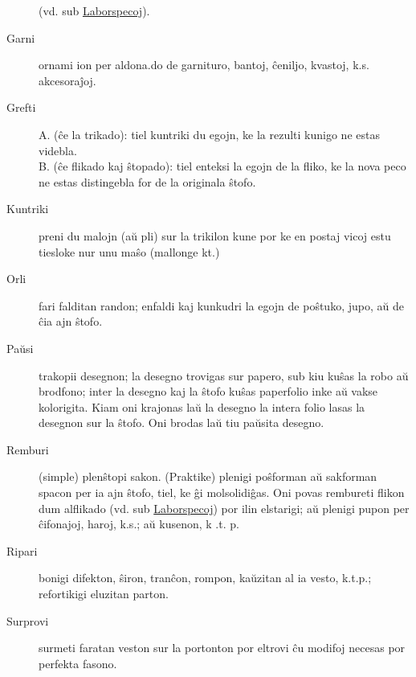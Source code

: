 \begin{description}
 (vd. sub \hyperlink{Laborspecoj}{Laborspecoj}).

\item[Garni]

 ornami ion per aldona.do de garnituro, bantoj, ĉeniljo, kvastoj, k.s. akcesoraĵoj.

\item[Grefti]

 A. (ĉe la trikado): tiel kuntriki du egojn, ke la rezulti kunigo ne estas videbla.\\
B. (ĉe flikado kaj ŝtopado): tiel enteksi la egojn de la fliko, ke la nova peco ne estas distingebla for de la originala ŝtofo.

\item[Kuntriki]

 preni du malojn (aŭ pli) sur la trikilon kune por ke en postaj vicoj estu tiesloke nur unu maŝo (mallonge kt.)

\item[Orli]

 fari falditan randon; enfaldi kaj kunkudri la egojn de poŝtuko, jupo, aŭ de ĉia ajn ŝtofo.

\item[\dagger\space Paŭsi]

 trakopii desegnon; la desegno trovigas sur papero, sub kiu kuŝas la robo aŭ brodfono; inter la desegno kaj la ŝtofo kuŝas paperfolio inke aŭ vakse kolorigita. Kiam oni krajonas laŭ la desegno la intera folio lasas la desegnon sur la ŝtofo. Oni brodas laŭ tiu paŭsita desegno.

\item[Remburi]

 (simple) plenŝtopi sakon. (Praktike) plenigi poŝforman aŭ sakforman spacon per ia ajn ŝtofo, tiel, ke ĝi molsolidiĝas. Oni povas rembureti flikon dum alflikado (vd. sub \hyperlink{Laborspecoj}{Laborspecoj}) por ilin elstarigi; aŭ plenigi pupon per ĉifonajoj, haroj, k.s.; aŭ kusenon, k .t. p.

\item[Ripari]

 bonigi difekton, ŝiron, tranĉon, rompon, kaŭzitan al ia vesto, k.t.p.; refortikigi eluzitan parton.

\item[Surprovi]

 surmeti faratan veston sur la portonton por eltrovi ĉu modifoj necesas por perfekta fasono.


\end{description}
